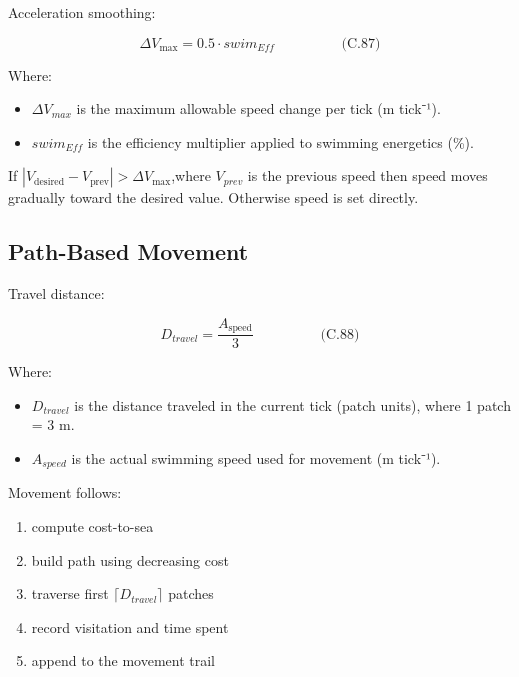 \documentclass[
]{book}
\providecommand{\tightlist}{%
  \setlength{\itemsep}{0pt}\setlength{\parskip}{0pt}}
\begin{document}
Acceleration smoothing:

\[
\begin{equation} \Delta V_{\max} = 0.5 \cdot swim_{Eff}  \hspace{2cm} \text{(C.87)} \end{equation}
\]

Where:

\begin{itemize}
\tightlist
\item
  \(\Delta V_{max}\) is the maximum allowable speed change per tick (m
  tick⁻¹).
\item
  \(swim_{Eff}\) is the efficiency multiplier applied to swimming
  energetics (\%).
\end{itemize}

If \(|V_{\text{desired}} - V_{\text{prev}}| > \Delta V_{\max}\),where
\(V_{prev}\) is the previous speed then speed moves gradually toward the
desired value. Otherwise speed is set directly.

\subsection{Path-Based Movement}\label{path-based-movement-1}

Travel distance:

\[
\begin{equation} D_{travel}
=
\frac{A_{\text{speed}}}{3}  \hspace{2cm} \text{(C.88)} \end{equation}
\]

Where:

\begin{itemize}
\tightlist
\item
  \(D_{travel}\) is the distance traveled in the current tick (patch
  units), where 1 patch = 3 m.
\item
  \(A_{speed}\) is the actual swimming speed used for movement (m
  tick⁻¹).
\end{itemize}

Movement follows:

\begin{enumerate}
\def\labelenumi{\arabic{enumi}.}
\tightlist
\item
  compute cost-to-sea
\item
  build path using decreasing cost
\item
  traverse first \(\lceil D_{travel} \rceil\) patches
\item
  record visitation and time spent
\item
  append to the movement trail
\end{enumerate}
\end{document}
